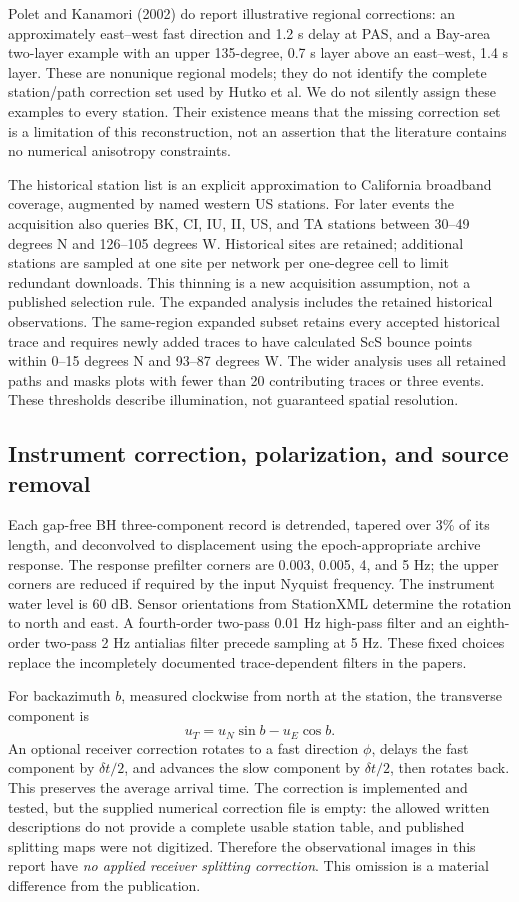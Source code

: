 Polet and Kanamori (2002) do report illustrative regional corrections: an
approximately east--west fast direction and 1.2 s delay at PAS, and a Bay-area
two-layer example with an upper 135-degree, 0.7 s layer above an east--west,
1.4 s layer. These are nonunique regional models; they do not identify the
complete station/path correction set used by Hutko et al. We do not silently
assign these examples to every station. Their existence means that the missing
correction set is a limitation of this reconstruction, not an assertion that
the literature contains no numerical anisotropy constraints.

The historical station list is an explicit approximation to California broadband
coverage, augmented by named western US stations. For later events the acquisition
also queries BK, CI, IU, II, US, and TA stations between 30--49 degrees N and
126--105 degrees W. Historical sites are retained; additional stations are sampled
at one site per network per one-degree cell to limit redundant downloads. This
thinning is a new acquisition assumption, not a published selection rule. The
expanded analysis includes the retained historical observations. The same-region
expanded subset retains every accepted historical trace and requires newly added
traces to have calculated ScS bounce points within 0--15 degrees N and
93--87 degrees W. The wider analysis uses all retained paths and masks plots with
fewer than 20 contributing traces or three events. These thresholds describe
illumination, not guaranteed spatial resolution.

\subsection{Instrument correction, polarization, and source removal}
Each gap-free BH three-component record is detrended, tapered over 3\% of its
length, and deconvolved to displacement using the epoch-appropriate archive
response. The response prefilter corners are 0.003, 0.005, 4, and 5 Hz; the upper
corners are reduced if required by the input Nyquist frequency. The instrument
water level is 60 dB. Sensor orientations from StationXML determine the rotation
to north and east. A fourth-order two-pass 0.01 Hz high-pass filter and an
eighth-order two-pass 2 Hz antialias filter precede sampling at 5 Hz. These fixed
choices replace the incompletely documented trace-dependent filters in the papers.

For backazimuth $b$, measured clockwise from north at the station, the transverse
component is
\begin{equation} u_T=u_N\sin b-u_E\cos b. \end{equation}
An optional receiver correction rotates to a fast direction $\phi$, delays the
fast component by $\delta t/2$, and advances the slow component by $\delta t/2$,
then rotates back. This preserves the average arrival time. The correction is
implemented and tested, but the supplied numerical correction file is empty:
the allowed written descriptions do not provide a complete usable station table,
and published splitting maps were not digitized. Therefore the observational
images in this report have \emph{no applied receiver splitting correction}.
This omission is a material difference from the publication.

